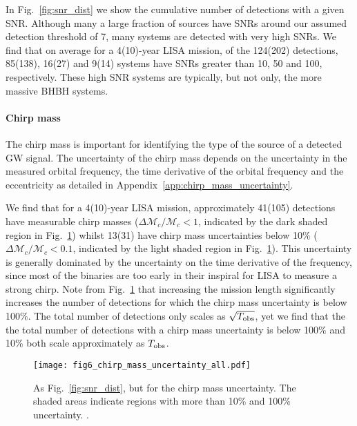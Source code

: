 In Fig.~\ref{fig:snr_dist} we show the cumulative number of detections with a given SNR. Although many a large fraction of sources have SNRs around our assumed detection threshold of 7, many systems are detected with very high SNRs. We find that on average for a 4(10)-year LISA mission, of the 124(202) detections, 85(138), 16(27) and 9(14) systems have SNRs greater than 10, 50 and 100, respectively. These high SNR systems are typically, but not only, the more massive BHBH systems.

\paragraph{Chirp mass}

The chirp mass is important for identifying the type of the source of a detected GW signal. The uncertainty of the chirp mass depends on the uncertainty in the measured orbital frequency, the time derivative of the orbital frequency and the eccentricity as detailed in Appendix~\ref{app:chirp_mass_uncertainty}.

We find that for a 4(10)-year LISA mission, approximately 41(105) detections have measurable chirp masses ($\Delta \mathcal{M}_c / \mathcal{M}_c < 1$, indicated by the dark shaded region in Fig.~\ref{fig:m_c_unc}) whilst 13(31) have chirp mass uncertainties below 10\% ($\Delta \mathcal{M}_c / \mathcal{M}_c < 0.1$, indicated by the light shaded region in Fig.~\ref{fig:m_c_unc}). This uncertainty is generally dominated by the uncertainty on the time derivative of the frequency, since most of the binaries are too early in their inspiral for LISA to measure a strong chirp.
%
Note from Fig.~\ref{fig:m_c_unc} that increasing the mission length significantly increases the number of detections for which the chirp mass uncertainty is below 100\%. The total number of detections only scales as $\sqrt{T_{\rm obs}}$, yet we find that the the total number of detections with a chirp mass uncertainty is below 100\% and 10\% both scale approximately as $T_{\rm obs}$.

\begin{figure}[tb]
    \centering
    \texttt{[image: fig6\_chirp\_mass\_uncertainty\_all.pdf]}
    \caption{As Fig.~\ref{fig:snr_dist}, but for the chirp mass uncertainty. The shaded areas indicate regions with more than 10\% and 100\% uncertainty. \href{https://github.com/TomWagg/detecting-DCOs-in-LISA/blob/main/paper/figures/fig6_chirp_mass_uncertainty_all.pdf}{\faFileImage} \href{https://github.com/TomWagg/detecting-DCOs-in-LISA/blob/main/paper/figure_notebooks/fiducial.ipynb}{\faBook}.}
    \label{fig:m_c_unc}
\end{figure}

